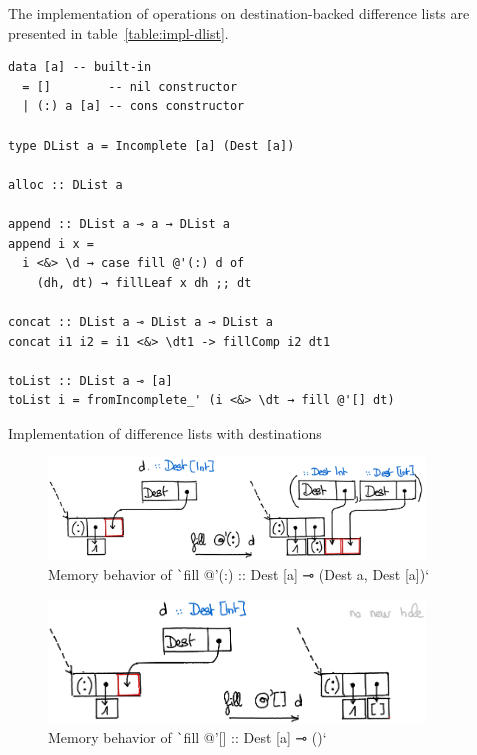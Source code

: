 \documentclass[english]{jflart}
\begin{document}


The implementation of operations on destination-backed difference lists are presented in table~\ref{table:impl-dlist}.
\begin{table}[t]
\small
\begin{verbatim}
data [a] -- built-in
  = []        -- nil constructor
  | (:) a [a] -- cons constructor

type DList a = Incomplete [a] (Dest [a])

alloc :: DList a

append :: DList a ⊸ a → DList a
append i x =
  i <&> \d → case fill @'(:) d of
    (dh, dt) → fillLeaf x dh ;; dt

concat :: DList a ⊸ DList a ⊸ DList a
concat i1 i2 = i1 <&> \dt1 -> fillComp i2 dt1

toList :: DList a ⊸ [a]
toList i = fromIncomplete_' (i <&> \dt → fill @'[] dt)
\end{verbatim}
\caption{Implementation of difference lists with destinations}
\label{table:impl-dlist}
\end{table}

\begin{figure}[t]\centering
  \includegraphics[width=10cm]{fillCons.png}
  \caption{Memory behavior of \texttt`fill @'(:) :: Dest [a] ⊸ (Dest a, Dest [a])`}
  \label{fig:schema-fillCons}
\end{figure}

\begin{figure}[t]\centering
  \includegraphics[width=10cm]{fillNil.png}
  \caption{Memory behavior of \texttt`fill @'[] :: Dest [a] ⊸ ()`}
  \label{fig:schema-fillNil}
\end{figure}
\end{document}
